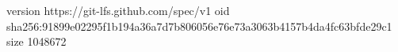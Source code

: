 version https://git-lfs.github.com/spec/v1
oid sha256:91899e02295f1b194a36a7d7b806056e76e73a3063b4157b4da4fc63bfde29c1
size 1048672
